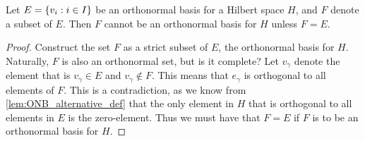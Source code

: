 \documentclass[../thesis.tex]{subfiles}
\begin{document}

\begin{lemma}
    Let $E = \{v_i : i \in I\}$ be an orthonormal basis for a Hilbert space $H$, and $F$ denote a subset of $E$. Then $F$ cannot be an orthonormal basis for $H$ unless $F = E$.
\end{lemma}
\begin{proof}
    Construct the set $F$ as a strict subset of $E$, the orthonormal basis for $H$. Naturally, $F$ is also an orthonormal set, but is it complete? Let $v_\gamma$ denote the element that is $v_{\gamma}\in E$ and $v_{\gamma}\notin F$. This means that $e_{\gamma}$ is orthogonal to all elements of $F$. This is a contradiction, as we know from \cref{lem:ONB_alternative_def} that the only element in $H$ that is orthogonal to all elements in $E$ is the zero-element. Thus we must have that $F=E$ if $F$ is to be an orthonormal basis for $H$.
\end{proof}
\end{document}
